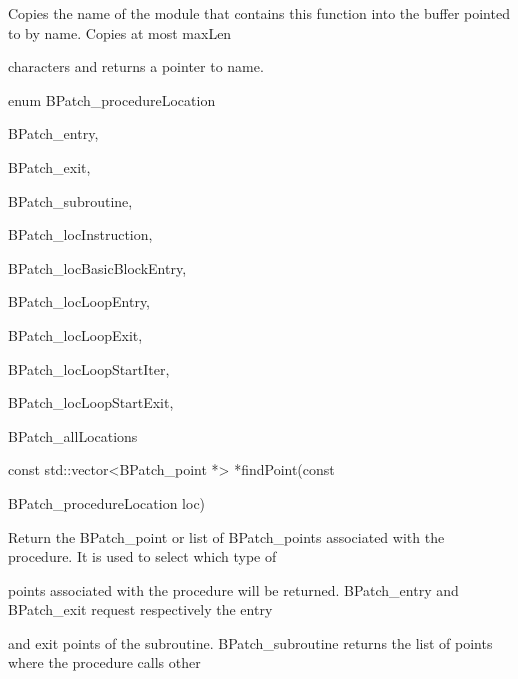 {{

Copies the name of the module that contains this function into the buffer pointed to by name. Copies at most maxLen

characters and returns a pointer to name.}



{

enum BPatch_procedureLocation {



{

BPatch_entry,



{

BPatch_exit,



{

BPatch_subroutine,



{

BPatch_locInstruction,}



{

BPatch_locBasicBlockEntry,}



{

BPatch_locLoopEntry,}



{

BPatch_locLoopExit,}



{

BPatch_locLoopStartIter,}



{

BPatch_locLoopStartExit,}



{

BPatch_allLocations }}



{

const std::vector<BPatch_point *> *findPoint(const

BPatch_procedureLocation loc)}



{

Return the BPatch_point or list of BPatch_points associated with the procedure. It is used to select which type of

points associated with the procedure will be returned. BPatch_entry and BPatch_exit request respectively the entry

and exit points of the subroutine. BPatch_subroutine returns the list of points where the procedure calls other

}}}}}}
